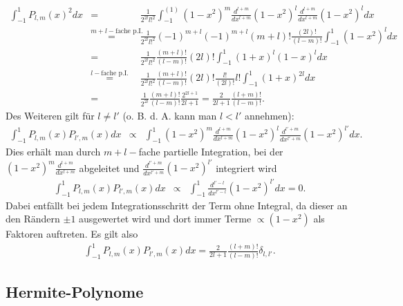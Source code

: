 \documentclass{book}
\begin{document}
\begin{eqnarray}
\int_{-1}^{1}P_{l, m}\left(x\right)^2dx & = & \frac{1}{2^{2l}l!^2}\int_{-1}^{\left(1\right)}\left(1 - x^2\right)^m\frac{d^{l + m}}{dx^{l + m}}\left(1 - x^2\right)^l\frac{d^{l + m}}{dx^{l + m}}\left(1 - x^2\right)^ldx\nonumber\\
&\stackrel{m+l-\text{fache p.I}.}{=}&\frac{1}{2^{2l}l!^2}\left(-1\right)^{m + l}\left(-1\right)^{m + l}\left(m + l\right)!\frac{\left(2l\right)!}{\left(l - m\right)!}\int_{-1}^{1}\left(1 - x^2\right)^ldx\nonumber\\
& = & \frac{1}{2^{2l}l!^2}\frac{\left(m + l\right)!}{\left(l - m\right)!}\left(2l\right)!\int_{-1}^{1}\left(1 + x\right)^l\left(1 - x\right)^ldx\nonumber\\
&\stackrel{l-\text{fache p.I}.}{=}&\frac{1}{2^{2l}l!^2}\frac{\left(m + l\right)!}{\left(l - m\right)!}\left(2l\right)!\frac{l!}{\left(2l\right)!}l!\int_{-1}^{1}\left(1 + x\right)^{2l}dx\nonumber\\
& = & \frac{1}{2^{2l}}\frac{\left(m + l\right)!}{\left(l - m\right)!}\frac{2^{2l + 1}}{2l + 1} = \frac{2}{2l + 1}\frac{\left(l + m\right)!}{\left(l - m\right)!}.
\end{eqnarray}
%
Des Weiteren gilt für $l\not = l'$ (o. B. d. A. kann man $l<l'$ annehmen):
%
\begin{eqnarray}
\int_{-1}^{1}P_{l, m}\left(x\right)P_{l', m}\left(x\right)dx&\propto&\int_{-1}^{1}\left(1 - x^2\right)^m\frac{d^{l + m}}{dx^{l + m}}\left(1 - x^2\right)^l\frac{d^{l' + m}}{dx^{l' + m}}\left(1 - x^2\right)^{l'}dx.
\end{eqnarray}
Dies erhält man durch $m + l-$fache partielle Integration, bei der $\left(1 - x^2\right)^m\frac{d^{l + m}}{dx^{l + m}}$ abgeleitet und $\frac{d^{l' + m}}{dx^{l' + m}}\left(1 - x^2\right)^{l'}$ integriert wird
%
\begin{eqnarray}
\int_{-1}^{1}P_{l, m}\left(x\right)P_{l', m}\left(x\right)dx&\propto&\int_{-1}^{1}\frac{d^{l' - l}}{dx^{l' - l}}\left(1 - x^2\right)^{l'}dx = 0.\label{eq:ortho_ass_lgen}
\end{eqnarray}
%
Dabei entfällt bei jedem Integrationsschritt der Term ohne Integral, da dieser an den Rändern $\pm 1$ ausgewertet wird und dort immer Terme $\propto\left(1 - x^2\right)$ als Faktoren auftreten. Es gilt also
%
\begin{eqnarray}
\int_{-1}^{1}P_{l, m}\left(x\right)P_{l', m}\left(x\right)dx = \frac{2}{2l + 1}\frac{\left(l + m\right)!}{\left(l - m\right)!}\delta_{l, l'}.
\end{eqnarray}
%
\subsection{Hermite-Polynome}
\label{sec:hermitepolynome}
\end{document}
